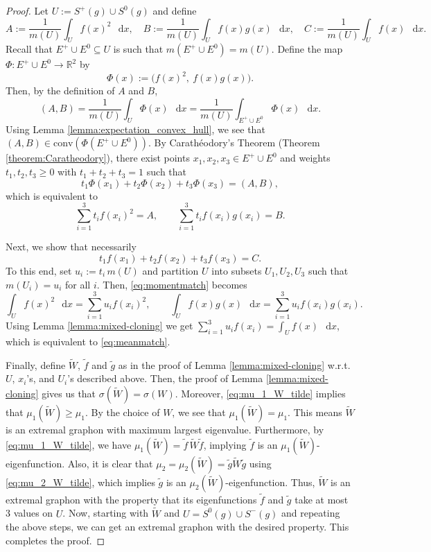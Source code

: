 \documentclass[11pt]{article}
\theoremstyle{plain}
\theoremstyle{definition}
\numberwithin{equation}{section}
\newcommand{\dif}{\mathop{}\!\mathrm{d}}
\begin{document}
\begin{proof} 
Let $U:=S^+(g)\cup S^0(g)$ and define
\[
A:=\frac{1}{m(U)} \int_U f(x)^2\,\dif{x},\quad 
B:=\frac{1}{m(U)} \int_U f(x)g(x)\,\dif{x},\quad
C:=\frac{1}{m(U)} \int_U f(x)\,\dif{x}.
\]
Recall that $E^+\cup E^0\subseteq U$ is such that $m(E^+\cup E^0)=m(U)$. 
Define the map $\Phi:E^+\cup E^0\to\mathbb R^2$ by
\[
\Phi(x):=\bigl(f(x)^2,\ f(x)g(x)\bigr).
\]
Then, by the definition of $A$ and $B$,
\[
(A,B)=\frac{1}{m(U)} \int_U \Phi(x)\,\dif{x} = \frac{1}{m(U)} \int_{E^+\cup E^0} \Phi(x)\,\dif{x}.
\]
Using Lemma \ref{lemma:expectation_convex_hull}, we see that $(A,B)\in \mathrm{conv}(\Phi(E^+\cup E^0))$. 
By Carath\'eodory's Theorem (Theorem \ref{theorem:Caratheodory}), there exist points $x_1,x_2,x_3\in E^+\cup E^0$ 
and weights $t_1,t_2,t_3\ge 0$ with $t_1+t_2+t_3=1$ such that
\[
t_1\Phi(x_1)+t_2\Phi(x_2)+t_3\Phi(x_3)=(A,B),
\]
which is equivalent to 
\begin{equation}\label{eq:momentmatch}
\sum_{i=1}^3 t_i f(x_i)^2 = A,\qquad
\sum_{i=1}^3 t_i f(x_i)g(x_i) = B.
\end{equation}

Next, we show that necessarily
\begin{equation}\label{eq:meanmatch}
t_1 f(x_1)+t_2 f(x_2)+t_3 f(x_3)=C.
\end{equation}
To this end, set $u_i:=t_i\, m(U)$ and partition $U$ into subsets $U_1, U_2, U_3$ 
such that $m(U_i) = u_i$ for all $i$. Then, \eqref{eq:momentmatch} becomes
\[
\int_U f(x)^2\,\dif{x} = \sum_{i=1}^3 u_i f(x_i)^2,\qquad
\int_U f(x)g(x)\,\dif{x} = \sum_{i=1}^3 u_i f(x_i)g(x_i).
\]
Using Lemma \ref{lemma:mixed-cloning} we get $\sum_{i=1}^3 u_i f(x_i)=\int_U f(x)\,\dif{x}$, 
which is equivalent to \eqref{eq:meanmatch}.

Finally, define $\widetilde{W}$, $\tilde{f}$ and $\tilde{g}$ as in the proof of 
Lemma \ref{lemma:mixed-cloning} w.r.t. $U$, $x_i$'s, and $U_i$'s described above. Then, 
the proof of Lemma \ref{lemma:mixed-cloning} gives us that $\sigma(\widetilde{W})=\sigma(W)$. 
Moreover, \eqref{eq:mu_1_W_tilde} implies that $\mu_1(\widetilde{W})\ge \mu_1$. By the choice of $W$, 
we see that $\mu_1(\widetilde{W}) = \mu_1$. This means $\widetilde{W}$ is an extremal graphon 
with maximum largest eigenvalue. Furthermore, by \eqref{eq:mu_1_W_tilde}, we have 
$\mu_1(\widetilde{W})=\tilde{f}\, \widetilde{W}\tilde{f}$, implying $\tilde{f}$ is an 
$\mu_1(\widetilde{W})$-eigenfunction. Also, it is clear that 
$\mu_2 = \mu_2(\widetilde{W})=\tilde g \widetilde{W}\tilde{g}$ using \eqref{eq:mu_2_W_tilde}, 
which implies $\tilde{g}$ is an $\mu_2(\widetilde{W})$-eigenfunction. Thus, $\widetilde{W}$ 
is an extremal graphon with the property that its eigenfunctions $\tilde{f}$ and $\tilde{g}$ take at most 3 values on $U$. 
Now, starting with $\widetilde{W}$ and $U=S^0(g)\cup S^-(g)$ and repeating the above steps, 
we can get an extremal graphon with the desired property. This completes the proof. 
\end{proof}
\end{document}
